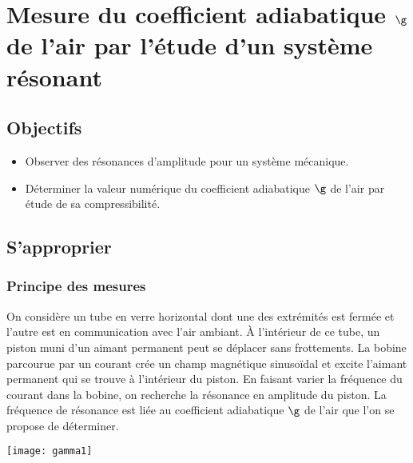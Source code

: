 \documentclass[a4paper, 11pt, final, garamond]{book}
\begin{document}
\setcounter{chapter}{18}

\chapter{Mesure du coefficient adiabatique $\g$ de l'air par l'\'etude d'un
syst\`eme r\'esonant}

\section{Objectifs}

\begin{itemize}
    \item Observer des résonances d'amplitude pour un système mécanique.
    \item Déterminer la valeur numérique du coefficient adiabatique $\g$ de
        l'air par étude de sa compressibilité.
\end{itemize}

\section{S'approprier}
\subsection{Principe des mesures}

\begin{minipage}{0.56\linewidth}
    On considère un tube en verre horizontal dont une des extrémités est fermée
    et l'autre est en communication avec l'air ambiant. À l'intérieur de ce
    tube, un piston muni d'un aimant permanent peut se déplacer sans
    frottements. La bobine parcourue par un courant crée un champ magnétique
    sinusoïdal et excite l'aimant permanent qui se trouve à l'intérieur du
    piston. \bigbreak
    En faisant varier la fréquence du courant dans la bobine, on recherche la
    résonance en amplitude du piston. La fréquence de résonance est liée au
    coefficient adiabatique $\g$ de l'air que l'on se propose de déterminer.
\end{minipage}
\hfill
\begin{minipage}{0.40\linewidth}
    \begin{center}
        \texttt{[image: gamma1]}
    \end{center}
\end{minipage}
\end{document}
